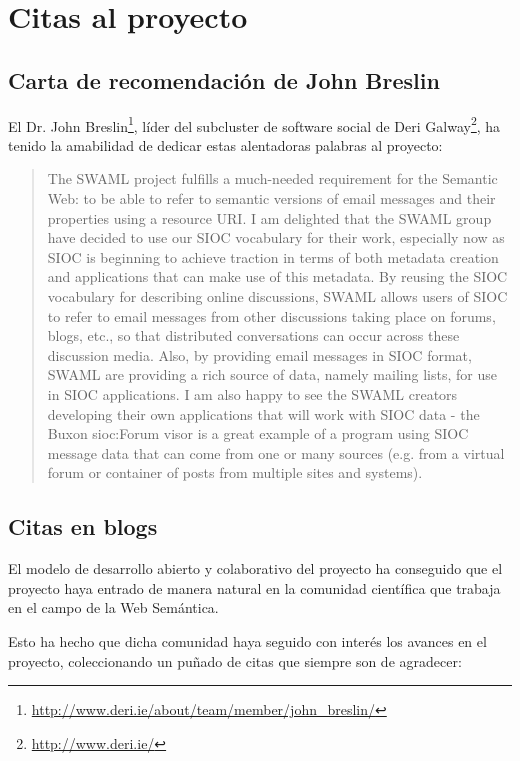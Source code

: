 
\chapter{Citas al proyecto}

\section{Carta de recomendación de John Breslin}

El Dr. John Breslin\footnote{\url{http://www.deri.ie/about/team/member/john_breslin/}},
líder del subcluster de software social de Deri Galway\footnote{\url{http://www.deri.ie/}},
ha tenido la amabilidad de dedicar estas alentadoras palabras al proyecto:

\begin{quote}
 The SWAML project fulfills a much-needed requirement for the Semantic 
 Web: to be able to refer to semantic versions of email messages and 
 their properties using a resource URI.  I am delighted that the SWAML 
 group have decided to use our SIOC vocabulary for their work, especially 
 now as SIOC is beginning to achieve traction in terms of both metadata 
 creation and applications that can make use of this metadata.  By 
 reusing the SIOC vocabulary for describing online discussions, SWAML 
 allows users of SIOC to refer to email messages from other discussions 
 taking place on forums, blogs, etc., so that distributed conversations 
 can occur across these discussion media.  Also, by providing email 
 messages in SIOC format, SWAML are providing a rich source of data, 
 namely mailing lists, for use in SIOC applications.  I am also happy to 
 see the SWAML creators developing their own applications that will work 
 with SIOC data - the Buxon sioc:Forum visor is a great example of a 
 program using SIOC message data that can come from one or many sources 
 (e.g. from a virtual forum or container of posts from multiple sites 
 and systems).
\end{quote}

\newpage

\section{Citas en blogs}

El modelo de desarrollo abierto y colaborativo del proyecto ha conseguido que el proyecto
haya entrado de manera natural en la comunidad científica que trabaja en el campo de la
Web Semántica.

Esto ha hecho que dicha comunidad haya seguido con interés los avances en el proyecto,
coleccionando un puñado de citas que siempre son de agradecer:

